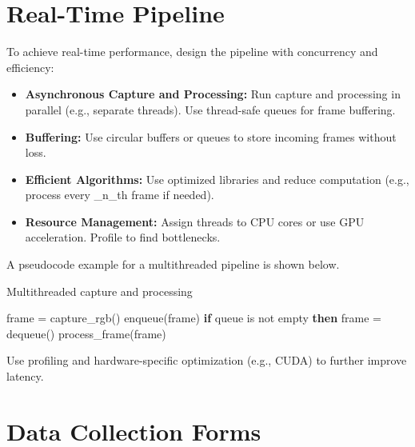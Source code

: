 \documentclass{article}
\begin{document}
    \section{Real-Time Pipeline}

    To achieve real-time performance, design the pipeline with concurrency and efficiency:
    \begin{itemize}
        \item \textbf{Asynchronous Capture and Processing:} Run capture and processing in parallel (e.g., separate threads). Use thread-safe queues for frame buffering.
        \item \textbf{Buffering:} Use circular buffers or queues to store incoming frames without loss.
        \item \textbf{Efficient Algorithms:} Use optimized libraries and reduce computation (e.g., process every _n_th frame if needed).
        \item \textbf{Resource Management:} Assign threads to CPU cores or use GPU acceleration. Profile to find bottlenecks.
    \end{itemize}
    A pseudocode example for a multithreaded pipeline is shown below.

    \begin{algorithm}
        \caption{Multithreaded capture and processing}
        \begin{algorithmic}[1]
            \STATE frame = capture\_rgb()
            \STATE enqueue(frame)
            \STATE \textbf{if} queue is not empty \textbf{then}
            \STATE \quad frame = dequeue()
            \STATE \quad process\_frame(frame)  
            \ENDWHILE
        \end{algorithmic}
    \end{algorithm}

    Use profiling and hardware-specific optimization (e.g., CUDA) to further improve latency.


    \section{Data Collection Forms}
\end{document}
